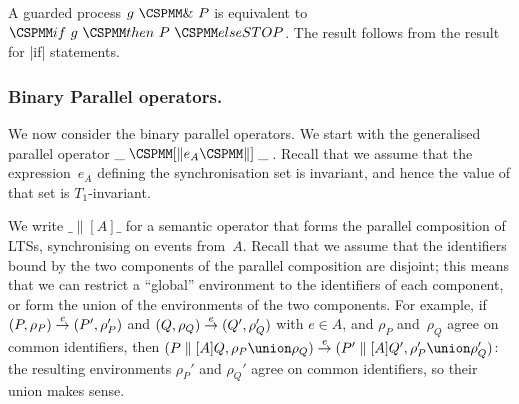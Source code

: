A guarded process $g ~\M{\&}~ P$ is equivalent to $\M{if}~ g ~ \M{then}~
P ~ \M{else STOP}$.  The result follows from the result for |if| statements.


\subsubsection{Binary Parallel operators.}
\label{sec:parallel}

We now consider the binary parallel operators.  We start with the generalised
parallel operator $\_ \;\M{[\|} e_A \M{\|]} \; \_$\,.  Recall that we assume
that the expression~$e_A$ defining the synchronisation set is invariant, and
hence the value of that set is $T_1$-invariant.

We write $\_ \parallel[A] \_$ for a semantic operator that forms the parallel
composition of LTSs, synchronising on events from~$A$.  
Recall that we assume
that the identifiers bound by the two components of the parallel composition
are disjoint; this means that we can restrict a ``global'' environment to the
identifiers of each component, or form the union of the environments of the
two components.  For example, if $(P, \rho_P) \stackrel{e}{\rightarrow} (P', \rho_P')$ and
$(Q, \rho_Q) \stackrel{e}{\rightarrow} (Q',
\rho_Q')$ with $e \in A$, and $\rho_P$ and~$\rho_Q$ agree on common
identifiers, then $(P \parallel[A] Q, \rho_P \union \rho_Q) \trans{e} (P'
\parallel[A] Q', \rho_P' \union \rho_Q')$: the resulting environments
$\rho_P'$ and $\rho_Q'$ agree on common identifiers, so their union makes
sense.

